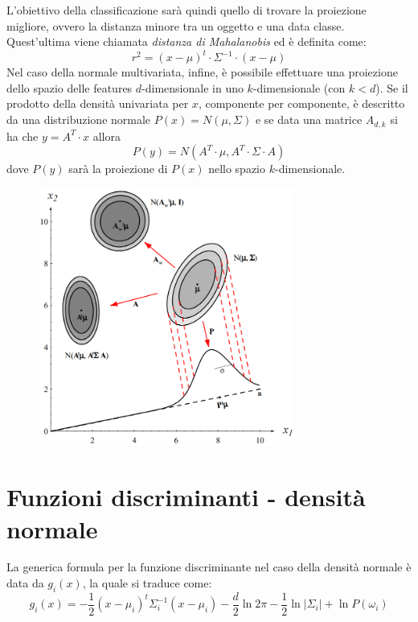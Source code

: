 \documentclass[a4paper,oneside,titlepage]{book}
\begin{document}
L'obiettivo della classificazione sarà quindi quello di trovare la proiezione migliore, ovvero la distanza minore tra un oggetto e una data classe. Quest'ultima viene chiamata \textit{distanza di Mahalanobis} ed è definita come:
\[ r^2 = (x - \mu)^t \cdot \Sigma^{-1} \cdot (x - \mu) \]
Nel caso della normale multivariata, infine, è possibile effettuare una proiezione dello spazio delle features $d$-dimensionale in uno $k$-dimensionale (con $k < d$). Se il prodotto della densità univariata per $x$, componente per componente, è descritto da una distribuzione normale $P(x) = N(\mu, \Sigma)$ e se data una matrice $A_{d,k}$ si ha che $y = A^T \cdot x$ allora
\[ P(y) = N(A^T \cdot \mu, A^T \cdot \Sigma \cdot A) \]
dove $P(y)$ sarà la proiezione di $P(x)$ nello spazio $k$-dimensionale.
\begin{figure}[htp]
	\centering
	\includegraphics[width=0.75\textwidth]{multivariata.png}
\end{figure}

\section{Funzioni discriminanti - densità normale}
La generica formula per la funzione discriminante nel caso della densità normale è data da $g_i(x)$, la quale si traduce come:
\[ g_i(x) = - \frac{1}{2} (x - \mu_i)^t \Sigma_i^{-1} (x - \mu_i) - \frac{d}{2} \ln 2 \pi - \frac{1}{2} \ln |\Sigma_i| + \ln P(\omega_i) \]
\end{document}
